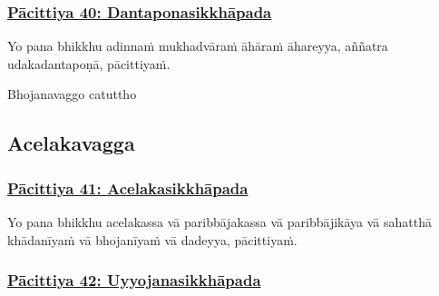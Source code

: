 \subsubsection*{\hyperref[exp40]{Pācittiya 40: Dantaponasikkhāpada}}
\label{pac40}

Yo pana bhikkhu adinnaṁ mukhadvāraṁ āhāraṁ\makeatletter\hyperlink{endnote307-appendix}\makeatother{} āhareyya, aññatra udakadantapoṇā,\makeatletter\hyperlink{endnote308-appendix}\makeatother{} pācittiyaṁ.

\begin{center}
	Bhojanavaggo catuttho
\end{center}



\subsection{Acelakavagga}
\label{pc-vagga5}

\subsubsection*{\hyperref[exp41]{Pācittiya 41: Acelakasikkhāpada}}
\label{pac41}

Yo pana bhikkhu acelakassa\makeatletter\hyperlink{endnote309-appendix}\makeatother{} vā paribbājakassa vā paribbājikāya vā sahatthā khādanīyaṁ vā bhojanīyaṁ\makeatletter\hyperlink{endnote310-appendix}\makeatother{} vā dadeyya, pācittiyaṁ.



\subsubsection*{\hyperref[exp42]{Pācittiya 42: Uyyojanasikkhāpada}}
\label{pac42}


